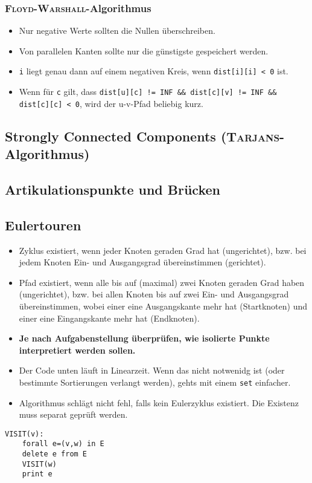 \subsubsection{\textsc{Floyd-Warshall}-Algorithmus}

\begin{itemize}
	\item Nur negative Werte sollten die Nullen überschreiben.
	\item Von parallelen Kanten sollte nur die günstigste gespeichert werden.
	\item \lstinline{i} liegt genau dann auf einem negativen Kreis, wenn \lstinline{dist[i][i] < 0} ist.
	\item Wenn für \lstinline{c} gilt, dass \lstinline{dist[u][c] != INF && dist[c][v] != INF && dist[c][c] < 0}, wird der u-v-Pfad beliebig kurz.
\end{itemize}

\subsection{Strongly Connected Components (\textsc{Tarjans}-Algorithmus)}


\subsection{Artikulationspunkte und Brücken}


\subsection{Eulertouren}
\begin{itemize}
	\item Zyklus existiert, wenn jeder Knoten geraden Grad hat (ungerichtet), bzw. bei jedem Knoten Ein- und Ausgangsgrad übereinstimmen (gerichtet).
	\item Pfad existiert, wenn alle bis auf (maximal) zwei Knoten geraden Grad haben (ungerichtet), bzw. bei allen Knoten bis auf zwei Ein- und Ausgangsgrad übereinstimmen, wobei einer eine Ausgangskante mehr hat (Startknoten) und einer eine Eingangskante mehr hat (Endknoten).
	\item \textbf{Je nach Aufgabenstellung überprüfen, wie isolierte Punkte interpretiert werden sollen.}
	\item Der Code unten läuft in Linearzeit.
	Wenn das nicht notwenidg ist (oder bestimmte Sortierungen verlangt werden), gehts mit einem \lstinline{set} einfacher.
	\item Algorithmus schlägt nicht fehl, falls kein Eulerzyklus existiert.
	Die Existenz muss separat geprüft werden.
\end{itemize}
\begin{lstlisting}
VISIT(v):
	forall e=(v,w) in E
	delete e from E
	VISIT(w)
	print e
\end{lstlisting}


